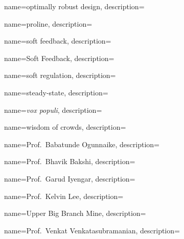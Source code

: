 	{
		name={optimally robust design},
		description={}
	}
	

	{
		name={proline},
		description={}
	}


	{
		name={soft feedback},
		description={}
	}

	{
		name={Soft Feedback},
		description={}
	}

	{
		name={soft regulation},
		description={}
	}
	
	{
		name={steady-state},
		description={}
	}	
		

	{
		name={{\it vox populi}},
		description={}
	}	


	{
		name={wisdom of crowds},
		description={}
	}
	
	
	{
		name={Prof.~Babatunde Ogunnaike},
		description={}
	}	

	{
		name={Prof.~Bhavik Bakshi},
		description={}
	}

	{
		name={Prof.~Garud Iyengar},
		description={}
	}	
	
	{
		name={Prof.~Kelvin Lee},
		description={}
	}	
	
	{
		name={Upper Big Branch Mine},
		description={}
	}

	{
		name={Prof.~Venkat Venkatasubramanian},
		description={}
	}




